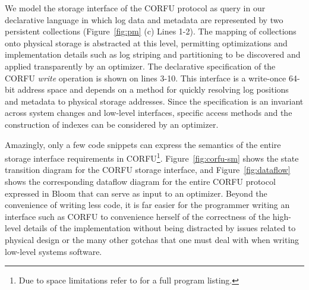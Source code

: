 We model the storage interface of the CORFU protocol as query in our
declarative language in which log data and metadata are represented by two
persistent collections (Figure~\ref{fig:pm} (c) Lines 1-2).  The mapping of
collections onto physical storage is abstracted at this level, permitting
optimizations and implementation details such as log striping and partitioning
to be discovered and applied transparently by an optimizer.  The declarative
specification of the CORFU \emph{write} operation is shown on lines 3-10.
This interface is a write-once 64-bit address space and depends on a method
for quickly resolving log positions and metadata to physical storage
addresses.  Since the specification is an invariant across system changes and
low-level interfaces, specific access methods and the construction of indexes
can be considered by an optimizer.

Amazingly, only a few code snippets can express the semantics of the entire
storage interface requirements in CORFU\footnote{Due to space limitations
refer to \cite{watkins:ucsc-soe-16-12} for a full program listing.}.
Figure~\ref{fig:corfu-sm} shows the state transition diagram for the CORFU
storage interface, and Figure~\ref{fig:dataflow} shows the corresponding
dataflow diagram for the entire CORFU protocol expressed in Bloom that can
serve as input to an optimizer.  Beyond the convenience of writing less code,
it is far easier for the programmer writing an interface such as CORFU to
convenience herself of the correctness of the high-level details of the
implementation without being distracted by issues related to physical design
or the many other gotchas that one must deal with when writing low-level
systems software.




